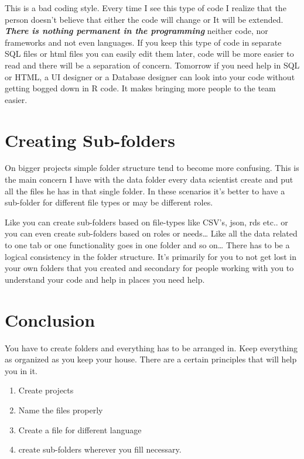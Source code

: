 \documentclass[
]{book}
\providecommand{\tightlist}{%
  \setlength{\itemsep}{0pt}\setlength{\parskip}{0pt}}
\begin{document}
This is a bad coding style. Every time I see this type of code I realize that the person doesn't believe that either the code will change or It will be extended. \textbf{\emph{There is nothing permanent in the programming}} neither code, nor frameworks and not even languages. If you keep this type of code in separate SQL files or html files you can easily edit them later, code will be more easier to read and there will be a separation of concern. Tomorrow if you need help in SQL or HTML, a UI designer or a Database designer can look into your code without getting bogged down in R code. It makes bringing more people to the team easier.

\hypertarget{creating-sub-folders}{%
\section{Creating Sub-folders}\label{creating-sub-folders}}

On bigger projects simple folder structure tend to become more confusing. This is the main concern I have with the data folder every data scientist create and put all the files he has in that single folder. In these scenarios it's better to have a sub-folder for different file types or may be different roles.

Like you can create sub-folders based on file-types like CSV's, json, rds etc.. or you can even create sub-folders based on roles or needs\ldots{} Like all the data related to one tab or one functionality goes in one folder and so on\ldots{} There has to be a logical consistency in the folder structure. It's primarily for you to not get lost in your own folders that you created and secondary for people working with you to understand your code and help in places you need help.

\hypertarget{conclusion}{%
\section{Conclusion}\label{conclusion}}

You have to create folders and everything has to be arranged in. Keep everything as organized as you keep your house. There are a certain principles that will help you in it.

\begin{enumerate}
\def\labelenumi{\arabic{enumi}.}
\tightlist
\item
  Create projects
\item
  Name the files properly
\item
  Create a file for different language
\item
  create sub-folders wherever you fill necessary.
\end{enumerate}
\end{document}
